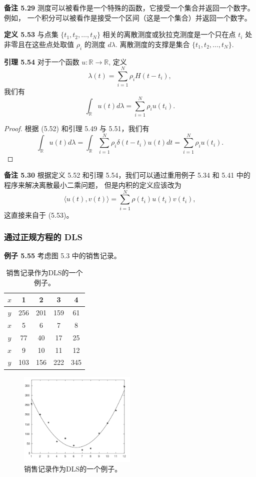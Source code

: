 \documentclass[a4paper]{ctexart}
\begin{document}
{\noindent \textbf{备注 5.29 } 测度可以被看作是一个特殊的函数，它接受一个集合并返回一个数字。例如，
一个积分可以被看作是接受一个区间（这是一个集合）并返回一个数字。

\noindent \textbf{定义 5.53 } 与点集 $\{t_1, t_2, \ldots, t_N\}$ 相关的离散测度或狄拉克测度是一个只在点 $t_i$ 处非零且在这些点处取值 $\rho_i$ 的测度 
$d\lambda$. 离散测度的支撑是集合 $\{t_1, t_2, \ldots, t_N\}$.

\noindent \textbf{引理 5.54 } 对于一个函数 $u: \mathbb{R} \rightarrow \mathbb{R}$, 定义
\[ 
  \lambda(t) = \sum_{i=1}^N \rho_i H(t - t_i), \tag{5.52}
\]
我们有
\[ 
  \int_{\mathbb{R}} u(t) d\lambda = \sum_{i=1}^N \rho_i u(t_i). \tag{5.53}
\]

\begin{proof}
根据 (5.52) 和引理 5.49 与 5.51，我们有
\[ 
  \int_{\mathbb{R}} u(t) d\lambda = \int_{\mathbb{R}} \sum_{i=1}^N \rho_i \delta(t - t_i) u(t) dt = \sum_{i=1}^N \rho_i u(t_i). 
\]    
\end{proof}

\noindent \textbf{备注 5.30 } 根据定义 5.52 和引理 5.54，我们可以通过重用例子 5.34 和 5.41 中的程序来解决离散最小二乘问题，
但是内积的定义应该改为
\[ 
  \langle u(t), v(t) \rangle = \sum_{i=1}^N \rho(t_i) u(t_i) v(t_i), 
\]
这直接来自于 (5.53)。

\subsubsection{通过正规方程的 DLS}

\textbf{例子 5.55 } 考虑图 5.3 中的销售记录。

\begin{table}[h]
\centering
\begin{tabular}{|c|c|c|c|c|}
\hline
$x$ & 1 & 2 & 3 & 4 \\ \hline
$y$ & 256 & 201 & 159 & 61 \\ \hline
$x$ & 5 & 6 & 7 & 8 \\ \hline
$y$ & 77 & 40 & 17 & 25 \\ \hline
$x$ & 9 & 10 & 11 & 12 \\ \hline
$y$ & 103 & 156 & 222 & 345 \\ \hline
\end{tabular}
\caption{销售记录作为DLS的一个例子。}
\end{table}

\begin{figure}[h]
  \centering
  \includegraphics[width=0.5\textwidth]{images/sales_record_plot.png}
  \caption{销售记录作为DLS的一个例子。}
\end{figure}

}
\end{document}
